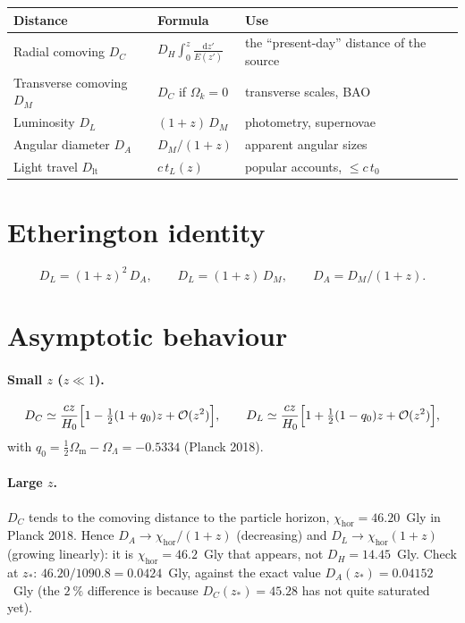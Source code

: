 \documentclass[11pt,a4paper,openany]{report}
\newcommand{\Hzero}{H_{0}}
\newcommand{\Om}{\Omega_{\mathrm{m}}}
\newcommand{\OL}{\Omega_{\Lambda}}
\newcommand{\Ok}{\Omega_{k}}
\newcommand{\dif}{\mathrm{d}}
\begin{document}
\begin{center}
\renewcommand{\arraystretch}{1.5}
\begin{tabular}{p{4.2cm}p{4.8cm}p{6cm}}
\toprule
\textbf{Distance} & \textbf{Formula} & \textbf{Use} \\
\midrule
Radial comoving $D_{C}$
 & $\displaystyle D_{H}\int_{0}^{z}\frac{\dif z'}{E(z')}$
 & the “present-day” distance of the source \\
Transverse comoving $D_{M}$
 & $D_{C}$ if $\Ok=0$
 & transverse scales, BAO \\
Luminosity $D_{L}$
 & $(1+z)\,D_{M}$
 & photometry, supernovae \\
Angular diameter $D_{A}$
 & $D_{M}/(1+z)$
 & apparent angular sizes \\
Light travel $D_{\text{lt}}$
 & $c\,t_{L}(z)$
 & popular accounts, $\le c\,t_{0}$ \\
\bottomrule
\end{tabular}
\end{center}

\section{Etherington identity}
\[
D_{L} = (1+z)^{2}\,D_{A}, \qquad D_{L} = (1+z)\,D_{M}, \qquad D_{A} = D_{M}/(1+z).
\]

\section{Asymptotic behaviour}

\paragraph{Small $z$ ($z\ll 1$).}
\[
D_{C} \simeq \frac{cz}{\Hzero}\Bigl[1 - \tfrac{1}{2}(1+q_{0})z + \mathcal{O}(z^{2})\Bigr],
\qquad
D_{L} \simeq \frac{cz}{\Hzero}\Bigl[1 + \tfrac{1}{2}(1-q_{0})z + \mathcal{O}(z^{2})\Bigr],
\]
with $q_{0} = \tfrac{1}{2}\Om - \OL = -\num{0.5334}$ (Planck 2018).

\paragraph{Large $z$.}
$D_{C}$ tends to the comoving distance to the particle horizon,
$\chi_{\text{hor}} = 46.20$~Gly in Planck 2018. Hence
$D_{A}\to \chi_{\text{hor}}/(1+z)$ (decreasing) and
$D_{L}\to \chi_{\text{hor}}(1+z)$ (growing linearly): it is
$\chi_{\text{hor}} = 46.2$~Gly that appears, not $D_{H} = 14.45$~Gly.
Check at $z_{*}$: $46.20/1090.8 = 0.0424$~Gly, against the exact value
$D_{A}(z_{*}) = 0.04152$~Gly (the $2~\%$ difference is because
$D_{C}(z_{*}) = 45.28$ has not quite saturated yet).
\end{document}

